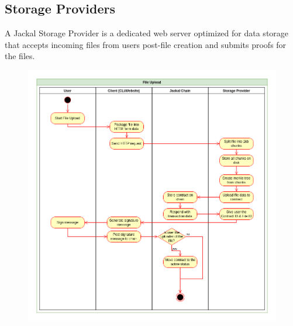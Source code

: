 \documentclass[a4paper]{article}
\begin{document}
\newpage
\subsection{Storage Providers}
A Jackal Storage Provider is a dedicated web server optimized for data storage that accepts incoming files from users post-file creation and submits proofs for the files.

\begin{figure}[!htbp]
\centering
{}
\end{figure}

\begin{figure}[!htbp]
\centering
\includegraphics[width=1\textwidth]{assets/providers2.png}
\caption{}
\end{figure}
\end{document}
